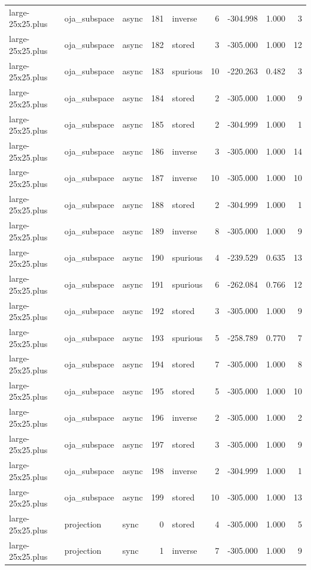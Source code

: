 \begin{tabular}{lllrlrrrr}
large-25x25.plus & oja\_subspace & async & 181 & inverse & 6 & -304.998 & 1.000 & 3 \\
large-25x25.plus & oja\_subspace & async & 182 & stored & 3 & -305.000 & 1.000 & 12 \\
large-25x25.plus & oja\_subspace & async & 183 & spurious & 10 & -220.263 & 0.482 & 3 \\
large-25x25.plus & oja\_subspace & async & 184 & stored & 2 & -305.000 & 1.000 & 9 \\
large-25x25.plus & oja\_subspace & async & 185 & stored & 2 & -304.999 & 1.000 & 1 \\
large-25x25.plus & oja\_subspace & async & 186 & inverse & 3 & -305.000 & 1.000 & 14 \\
large-25x25.plus & oja\_subspace & async & 187 & inverse & 10 & -305.000 & 1.000 & 10 \\
large-25x25.plus & oja\_subspace & async & 188 & stored & 2 & -304.999 & 1.000 & 1 \\
large-25x25.plus & oja\_subspace & async & 189 & inverse & 8 & -305.000 & 1.000 & 9 \\
large-25x25.plus & oja\_subspace & async & 190 & spurious & 4 & -239.529 & 0.635 & 13 \\
large-25x25.plus & oja\_subspace & async & 191 & spurious & 6 & -262.084 & 0.766 & 12 \\
large-25x25.plus & oja\_subspace & async & 192 & stored & 3 & -305.000 & 1.000 & 9 \\
large-25x25.plus & oja\_subspace & async & 193 & spurious & 5 & -258.789 & 0.770 & 7 \\
large-25x25.plus & oja\_subspace & async & 194 & stored & 7 & -305.000 & 1.000 & 8 \\
large-25x25.plus & oja\_subspace & async & 195 & stored & 5 & -305.000 & 1.000 & 10 \\
large-25x25.plus & oja\_subspace & async & 196 & inverse & 2 & -305.000 & 1.000 & 2 \\
large-25x25.plus & oja\_subspace & async & 197 & stored & 3 & -305.000 & 1.000 & 9 \\
large-25x25.plus & oja\_subspace & async & 198 & inverse & 2 & -304.999 & 1.000 & 1 \\
large-25x25.plus & oja\_subspace & async & 199 & stored & 10 & -305.000 & 1.000 & 13 \\
large-25x25.plus & projection & sync & 0 & stored & 4 & -305.000 & 1.000 & 5 \\
large-25x25.plus & projection & sync & 1 & inverse & 7 & -305.000 & 1.000 & 9 \\

\end{tabular}
